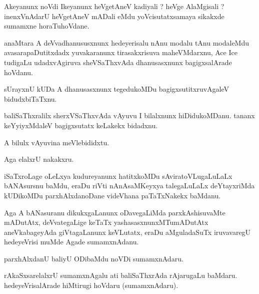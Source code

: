 \documentclass{article}
\begin{document}
\begin{mn}
Akeyanunx  noVdi  Ikeyanunx  heVgetAneV  kadiyali ?  heVge  AlaMgisali ?  inenxVnAdarU  heVgetAneV  mADali  eMdu  yoVcisutatxsamaya  sikakxde  
sumamxne  horaTuhoVdane.
\end{mn}

\begin{mn}
anaMtara  A  deVvadhanususxnunx  hedeyerisalu  nAnu  modalu  tAnu  modaleMdu  avasarapaDutitxdadx  yuvakaranunx  tirasakxrisuva  maheVMdarxnu,  
Ace  Ice  tudigaLu  udadxvAgiruva  sheVSaThxvAda  dhanusasxnunx  bagigxsalArade  hoVdanu.
\end{mn}

\begin{mn}
sUrayxnU  kUDa  A  dhanusasxnunx  tegedukoMDu  bagigxsutitxruvAgaleV  bidudxbiTaTxnu.
\end{mn}

\begin{mn}
baliSaThxralilx  sherxVSaThxvAda  vAyuvu  I  bilalxnunx  hiDidukoMDanu.  tananx  keYyiyxMdaleV  bagigxsutatx  keLakekx  bidadxnu.
\end{mn}

\begin{mn}
A  bilulx  vAyuvina  meVlebididxtu.
\end{mn}

\begin{mn}
Aga  elalxrU  nakakxru.
\end{mn}

\begin{mn}
iSaTxroLage  oLeLxya  kudureyanunx  hatitxkoMDu  sAviratoVLugaLuLaLx  bANAsursnu  baMdu,  eraDu  riVti  nAnAsaMKeyxya  talegaLuLaLx  deYtayxriMda  
kUDikoMDu  parxhAlxdanoDane  videVhana  paTaTxNakekx  baMdanu.
\end{mn}

\begin{mn}
Aga  A  bANasuranu  dikukxgaLanunx  oDavegaLiMda  parxkAshisuvaMte  mADutAtx,  deVvategaLige  keTaTx  yashasasxnunxMTumADutAtx  
aneVkabageyAda  giVtagaLanunx  keVLutatx,  eraDu  aMguladaSuTx  iruvavaregU  hedeyeVrisi  muMde  Agade  sumamxnAdanu.
\end{mn}

\begin{mn}
parxhAlxdanU  baliyU  ODibaMdu  noVDi  sumamxnAdaru.
\end{mn}

\begin{mn}
rAkaSxsarelalxrU  sumamxnAgalu  ati  baliSaThxrAda  rAjarugaLu  baMdaru.  hedeyeVrisalArade  hiMtirugi  hoVdaru (sumamxnAdaru).
\end{mn}
\end{document}
